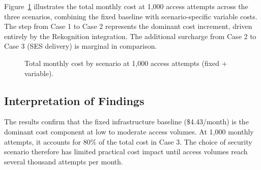 Figure~\ref{fig:cost_comparison} illustrates the total monthly cost at 1{,}000 access attempts across the three scenarios, combining the fixed baseline with scenario-specific variable costs. The step from Case 1 to Case 2 represents the dominant cost increment, driven entirely by the Rekognition integration. The additional surcharge from Case 2 to Case 3 (SES delivery) is marginal in comparison.

\begin{figure}[H]
\centering
{}
\caption{Total monthly cost by scenario at 1{,}000 access attempts (fixed + variable).}
\label{fig:cost_comparison}
\end{figure}

\subsection{Interpretation of Findings}

The results confirm that the fixed infrastructure baseline (\$4.43/month) is the dominant cost component at low to moderate access volumes. At 1{,}000 monthly attempts, it accounts for 80\% of the total cost in Case 3. The choice of security scenario therefore has limited practical cost impact until access volumes reach several thousand attempts per month.

